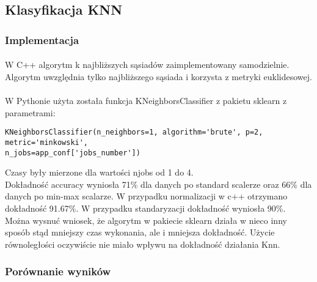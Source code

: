 \documentclass[a4paper,11pt]{article}
\begin{document}
\subsection{Klasyfikacja KNN} 
\subsubsection{Implementacja} 
\paragraph{}W C++ algorytm k najbliższych sąsiadów zaimplementowany samodzielnie. Algorytm uwzględnia tylko najbliższego sąsiada i korzysta z metryki euklidesowej.

\paragraph{}W Pythonie użyta została funkcja KNeighborsClassifier z pakietu sklearn z parametrami:
\begin{lstlisting}
KNeighborsClassifier(n_neighbors=1, algorithm='brute', p=2, metric='minkowski',
n_jobs=app_conf['jobs_number'])
\end{lstlisting}
Czasy były mierzone dla wartości njobs od 1 do 4. \\
Dokładność accuracy wyniosła 71\% dla danych po standard scalerze oraz 66\% dla danych po min-max scalarze.  
W przypadku normalizacji w c++ otrzymano dokładność 91.67\%. W przypadku standaryzacji dokładność wyniosła 90\%.
Można wysnuć wniosek, że algorytm w pakiecie sklearn działa w nieco inny sposób stąd mniejszy czas wykonania, ale i mniejsza dokładność. Użycie równoległości oczywiście nie miało wpływu na dokładność działania Knn.
\subsubsection{Porównanie wyników} 
\end{document}
